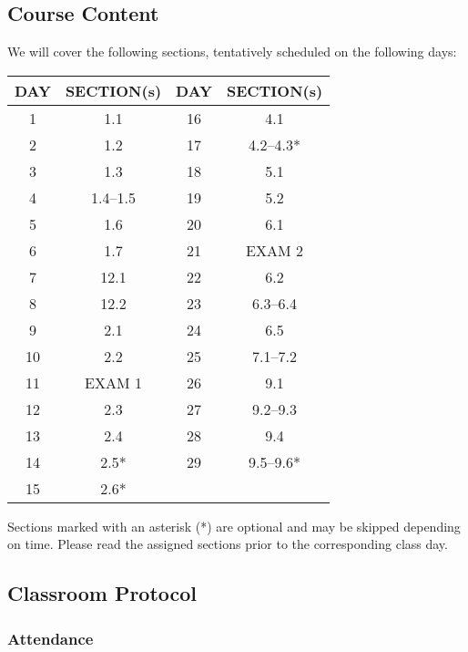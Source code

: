 \documentclass[letterpaper,12pt,fleqn]{article}
\begin{document}
\subsection*{Course Content}

We will cover the following sections, tentatively scheduled on the following days:

\begin{center}
  \begin{tabular}{|c|c|c|c|}
    \hline
    \textbf{DAY} & \textbf{SECTION(s)} & \textbf{DAY} & \textbf{SECTION(s)}\\
    \hline
    1 & 1.1 & 16 & 4.1 \\
    \hline
    2 & 1.2 & 17 & 4.2--4.3* \\
    \hline
    3 & 1.3 & 18 & 5.1 \\
    \hline
    4 & 1.4--1.5 & 19 & 5.2 \\
    \hline
    5 & 1.6 & 20 & 6.1 \\
    \hline
    6 & 1.7 & 21 & EXAM 2 \\
    \hline
    7 & 12.1 & 22 & 6.2 \\
    \hline
    8 & 12.2 & 23 & 6.3--6.4 \\
    \hline
    9 & 2.1 & 24 & 6.5 \\
    \hline
    10 & 2.2 & 25 & 7.1--7.2 \\
    \hline
    11 & EXAM 1 & 26 & 9.1 \\
    \hline
    12 & 2.3 & 27 & 9.2--9.3 \\
    \hline
    13 & 2.4 & 28 & 9.4 \\
    \hline
    14 & 2.5* & 29 & 9.5--9.6* \\
    \hline
    15 & 2.6* & & \\
    \hline
  \end{tabular}
\end{center}

Sections marked with an asterisk (*) are optional and may be skipped depending on time.  Please read the assigned
sections prior to the corresponding class day.

\subsection*{Classroom Protocol}
  
\subsubsection*{Attendance}
\end{document}

